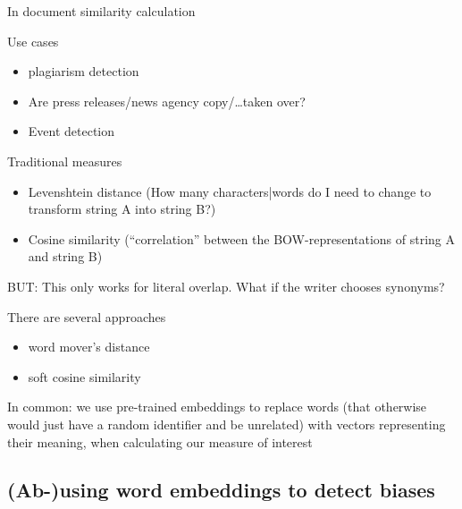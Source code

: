 \begin{frame}{In document similarity calculation}
  \begin{block}{Use cases}
    \begin{itemize}
    \item plagiarism detection
    \item Are press releases/news agency copy/\ldots taken over?
    \item Event detection
    \end{itemize}
  \end{block}
  \pause
  \begin{block}{Traditional measures}
    \begin{itemize}
    \item Levenshtein distance (How many characters|words do I need to change to transform string A into string B?)
    \item Cosine similarity (``correlation'' between the BOW-representations of string A and string B)
    \end{itemize}
  \end{block}
\end{frame}


\begin{frame}[plain]
	BUT: This only works for literal overlap. What if the writer chooses synonyms?
	\pause 
	
	
	
\cite{Kusner2015}
\end{frame}


\begin{frame}{There are several approaches}
  \begin{itemize}
  \item word mover's distance
  \item soft cosine similarity
  \end{itemize}
  In common: we use pre-trained embeddings to replace words (that otherwise would just have a random identifier and be unrelated) with vectors representing their meaning, when calculating our measure of interest
\end{frame}


\subsection[Detecting biases]{(Ab-)using word embeddings to detect biases}


